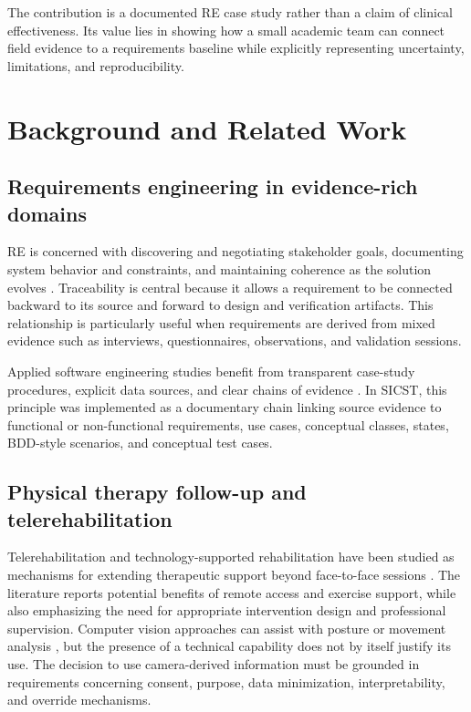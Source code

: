 \documentclass[10pt,a4paper]{article}
\begin{document}
The contribution is a documented RE case study rather than a claim of clinical effectiveness. Its value lies in showing how a small academic team can connect field evidence to a requirements baseline while explicitly representing uncertainty, limitations, and reproducibility.

\section{Background and Related Work}
\subsection{Requirements engineering in evidence-rich domains}
RE is concerned with discovering and negotiating stakeholder goals, documenting system behavior and constraints, and maintaining coherence as the solution evolves \citep{pohl2010requirements,iso29148_2018}. Traceability is central because it allows a requirement to be connected backward to its source and forward to design and verification artifacts. This relationship is particularly useful when requirements are derived from mixed evidence such as interviews, questionnaires, observations, and validation sessions.

Applied software engineering studies benefit from transparent case-study procedures, explicit data sources, and clear chains of evidence \citep{runeson2009guidelines}. In SICST, this principle was implemented as a documentary chain linking source evidence to functional or non-functional requirements, use cases, conceptual classes, states, BDD-style scenarios, and conceptual test cases.

\subsection{Physical therapy follow-up and telerehabilitation}
Telerehabilitation and technology-supported rehabilitation have been studied as mechanisms for extending therapeutic support beyond face-to-face sessions \citep{munoztomas2023telerehabilitation,susomarti2021effectiveness,gava2022shoulder}. The literature reports potential benefits of remote access and exercise support, while also emphasizing the need for appropriate intervention design and professional supervision. Computer vision approaches can assist with posture or movement analysis \citep{debnath2022rehabilitation,cao2021openpose,lugaresi2019mediapipe}, but the presence of a technical capability does not by itself justify its use. The decision to use camera-derived information must be grounded in requirements concerning consent, purpose, data minimization, interpretability, and override mechanisms.
\end{document}
